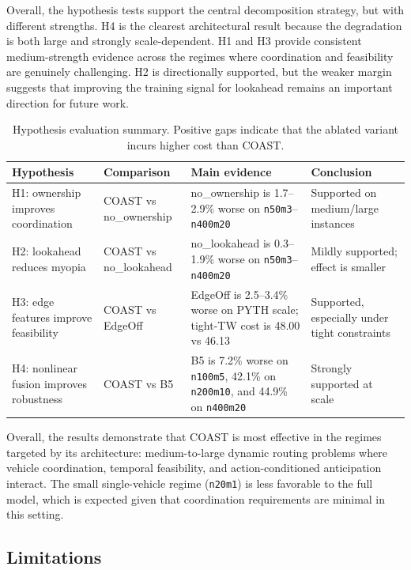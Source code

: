 \documentclass[letterpaper]{article}
\begin{document}
Overall, the hypothesis tests support the central decomposition strategy, but with different strengths. H4 is the clearest architectural result because the degradation is both large and strongly scale-dependent. H1 and H3 provide consistent medium-strength evidence across the regimes where coordination and feasibility are genuinely challenging. H2 is directionally supported, but the weaker margin suggests that improving the training signal for lookahead remains an important direction for future work.

\begin{table}[t]
\centering
{\small
\setlength{\tabcolsep}{1pt}
\begin{tabular}{p{}p{}p{}p{}}
\toprule
Hypothesis & Comparison & Main evidence & Conclusion \\
\midrule
H1: ownership improves coordination & COAST vs no\_ownership & no\_ownership is 1.7--2.9\% worse on \texttt{n50m3}--\texttt{n400m20} & Supported on medium/large instances \\
H2: lookahead reduces myopia & COAST vs no\_lookahead & no\_lookahead is 0.3--1.9\% worse on \texttt{n50m3}--\texttt{n400m20} & Mildly supported; effect is smaller \\
H3: edge features improve feasibility & COAST vs EdgeOff & EdgeOff is 2.5--3.4\% worse on PYTH scale; tight-TW cost is 48.00 vs 46.13 & Supported, especially under tight constraints \\
H4: nonlinear fusion improves robustness & COAST vs B5 & B5 is 7.2\% worse on \texttt{n100m5}, 42.1\% on \texttt{n200m10}, and 44.9\% on \texttt{n400m20} & Strongly supported at scale \\
\bottomrule
\end{tabular}
}
\caption{Hypothesis evaluation summary. Positive gaps indicate that the ablated variant incurs higher cost than COAST.}
\label{tab:hypotheses}
\end{table}

Overall, the results demonstrate that COAST is most effective in the regimes targeted by its architecture: medium-to-large dynamic routing problems where vehicle coordination, temporal feasibility, and action-conditioned anticipation interact. The small single-vehicle regime (\texttt{n20m1}) is less favorable to the full model, which is expected given that coordination requirements are minimal in this setting.

\subsection{Limitations}
\end{document}
